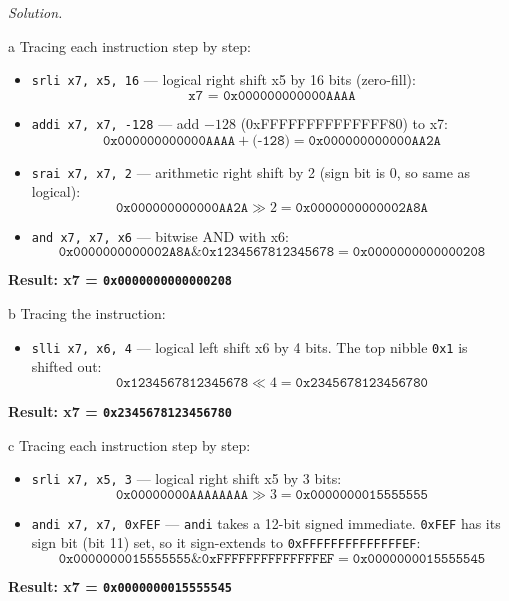 \documentclass[11pt]{article}
\newenvironment{solution}{\par\noindent\textit{Solution.}}{\par\vspace{1em}}
\begin{document}
\begin{solution}
    \begin{subproblem}{a}
        Tracing each instruction step by step:
        \begin{itemize}
            \item \texttt{srli x7, x5, 16} --- logical right shift x5 by 16 bits (zero-fill):
            \[ \texttt{x7 = 0x000000000000AAAA} \]
            \item \texttt{addi x7, x7, -128} --- add $-128$ (0xFFFFFFFFFFFFFF80) to x7:
            \[ \texttt{0x000000000000AAAA} + \texttt{(-128)} = \texttt{0x000000000000AA2A} \]
            \item \texttt{srai x7, x7, 2} --- arithmetic right shift by 2 (sign bit is 0, so same as logical):
            \[ \texttt{0x000000000000AA2A} \gg 2 = \texttt{0x0000000000002A8A} \]
            \item \texttt{and x7, x7, x6} --- bitwise AND with x6:
            \[ \texttt{0x0000000000002A8A} \mathbin{\&} \texttt{0x1234567812345678} = \texttt{0x0000000000000208} \]
        \end{itemize}
        \textbf{Result: x7 = \texttt{0x0000000000000208}}
    \end{subproblem}
    \begin{subproblem}{b}
        Tracing the instruction:
        \begin{itemize}
            \item \texttt{slli x7, x6, 4} --- logical left shift x6 by 4 bits. The top nibble \texttt{0x1} is shifted out:
            \[ \texttt{0x1234567812345678} \ll 4 = \texttt{0x2345678123456780} \]
        \end{itemize}
        \textbf{Result: x7 = \texttt{0x2345678123456780}}
    \end{subproblem}
    \begin{subproblem}{c}
        Tracing each instruction step by step:
        \begin{itemize}
            \item \texttt{srli x7, x5, 3} --- logical right shift x5 by 3 bits:
            \[ \texttt{0x00000000AAAAAAAA} \gg 3 = \texttt{0x0000000015555555} \]
            \item \texttt{andi x7, x7, 0xFEF} --- \texttt{andi} takes a 12-bit signed immediate. \texttt{0xFEF} has its sign bit (bit 11) set, so it sign-extends to \texttt{0xFFFFFFFFFFFFFFEF}:
            \[ \texttt{0x0000000015555555} \mathbin{\&} \texttt{0xFFFFFFFFFFFFFFEF} = \texttt{0x0000000015555545} \]
        \end{itemize}
        \textbf{Result: x7 = \texttt{0x0000000015555545}}
    \end{subproblem}
\end{solution}
\end{document}
